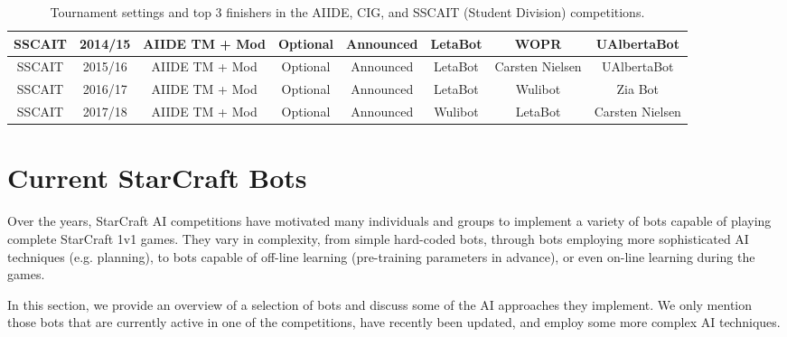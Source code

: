 \begin{table}[t]
\begin{center}
\begin{tabular} {| c | c | c c c | c c c |}
 \hline
 SSCAIT & 2014/15 & AIIDE TM + Mod & Optional & Announced & LetaBot & WOPR & UAlbertaBot\\
 \hline
 SSCAIT & 2015/16 & AIIDE TM + Mod & Optional & Announced & LetaBot & Carsten Nielsen & UAlbertaBot \\
 \hline
 SSCAIT & 2016/17 & AIIDE TM + Mod & Optional & Announced & LetaBot & Wulibot & Zia Bot\\
 \hline
 SSCAIT & 2017/18 & AIIDE TM + Mod & Optional & Announced & Wulibot & LetaBot & Carsten Nielsen\\
 \hline
 \end{tabular}
 \end{center}  
 \caption{Tournament settings and top 3 finishers in the AIIDE, CIG, and SSCAIT (Student Division) competitions.}
 \label{tableTournaments}
\end{table} 

\section{Current StarCraft Bots}\label{secBots}

Over the years, StarCraft AI competitions have motivated many individuals and groups to implement a variety of bots capable of playing complete StarCraft 1v1 games. They vary in complexity, from simple hard-coded bots, through bots employing more sophisticated AI techniques (e.g. planning), to bots capable of off-line learning (pre-training parameters in advance), or even on-line learning during the games.

In this section, we provide an overview of a selection of bots and discuss some of the AI approaches they implement. We only mention those bots that are currently active in one of the competitions, have recently been updated, and employ some more complex AI techniques. 

